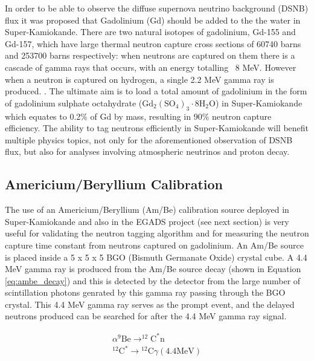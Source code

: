 In order to be able to observe the diffuse supernova neutrino background (DSNB) flux it was proposed that Gadolinium (Gd) should be added to the the water in Super-Kamiokande. There are two natural isotopes of gadolinium, Gd-155 and Gd-157, which have large thermal neutron capture cross sections of 60740 barns and 253700 barns respectively: when neutrons are captured on them there is a cascade of gamma rays that occurs, with an energy totalling ~8 MeV. However when a neutron is captured on hydrogen, a single 2.2 MeV gamma ray is produced. \cite{meo_measurement_nodate}.  The ultimate aim is to load a total amount of gadolinium in the form of gadolinium sulphate octahydrate ($
\mathrm{Gd}_{2}\left(\mathrm{SO}_{4}\right)_{3} \cdot 8 \mathrm{H}_{2} \mathrm{O}$) in Super-Kamiokande which equates to 0.2\% of Gd by mass, resulting in 90\% neutron capture efficiency. The ability to tag neutrons efficiently in Super-Kamiokande will benefit multiple physics topics, not only for the aforementioned observation of DSNB flux, but also for analyses involving atmospheric neutrinos and proton decay. 

\subsection{Americium/Beryllium Calibration}

The use of an Americium/Beryllium (Am/Be) calibration source deployed in Super-Kamiokande and also in the EGADS project (see next section) is very useful for validating the neutron tagging algorithm and for measuring the neutron capture time constant from neutrons captured on gadolinium. An Am/Be source is placed inside a 5 x 5 x 5 BGO (Bismuth Germanate Oxide) crystal cube. A 4.4 MeV gamma ray is produced from the Am/Be source decay (shown in Equation \ref{eq:ambe_decay}) and this is detected by the detector from the large number of scintillation photons genrated by this gamma ray passing through the BGO crystal. This 4.4 MeV gamma ray serves as the prompt event, and the delayed neutrons produced can be searched for after the 4.4 MeV gamma ray signal.

\begin{equation}
\begin{array}{c}
\alpha^{9} \mathrm{Be} \longrightarrow^{12} \mathrm{C}^{*} \mathrm{n} \\
{ }^{12} \mathrm{C}^{*} \longrightarrow{ }^{12} \mathrm{C} \gamma(4.4 \mathrm{MeV})
\end{array}
\label{eq:ambe_decay}
\end{equation}


